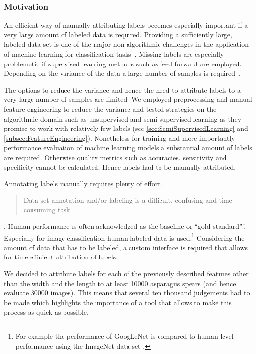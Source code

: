 \subsubsection{Motivation}
\label{subsec:Motivation}

An efficient way of manually attributing labels becomes especially important if a very large amount of labeled data is required. Providing a sufficiently large, labeled data set is one of the major non-algorithmic challenges in the application of machine learning for classification tasks~\citep{al2018labeling}. Missing labels are especially problematic if supervised learning methods such as feed forward  are employed. Depending on the variance of the data a large number of samples is required~\citep{russakovsky2015imagenet}.

\bigskip
The options to reduce the variance and hence the need to attribute labels to a very large number of samples are limited. We employed preprocessing and manual feature engineering to reduce the variance and tested strategies on the algorithmic domain such as unsupervised and semi-supervised learning as they promise to work with relatively few labels (see \autoref{sec:SemiSupervisedLearning} and  \autoref{subsec:FeatureEngineering}). Nonetheless for training and more importantly performance evaluation of machine learning models a substantial amount of labels are required. Otherwise quality metrics such as accuracies, sensitivity and specificity cannot be calculated. Hence labels had to be manually attributed.

Annotating labels manually requires plenty of effort. \blockquote{Data set annotation and/or labeling is a difficult, confusing and time consuming task} \citep[p.~2]{al2018labeling}. Human performance is often acknowledged as the baseline or \enquote{gold standard}’. Especially for image classification human labeled data is used.\footnote{For example the performance of GoogLeNet is compared to human level performance using the ImageNet data set \citep{russakovsky2015imagenet}.} Considering the amount of data that has to be labeled, a custom interface is required that allows for time efficient attribution of labels.

We decided to attribute labels for each of the previously described features other than the width and the length to at least 10000 asparagus spears (and hence evaluate 30000 images). This means that several ten thousand judgements had to be made which highlights the importance of a tool that allows to make this process as quick as possible.


